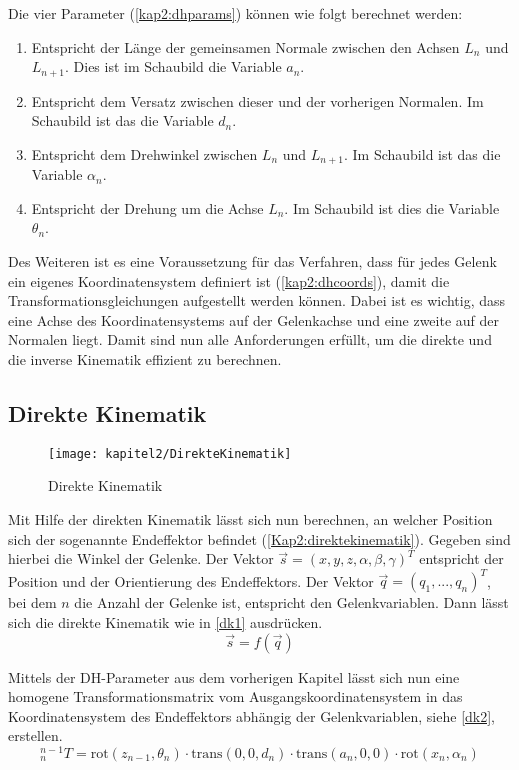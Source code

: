 Die vier Parameter (\autoref{kap2:dhparams}) können wie folgt berechnet werden:
\begin{enumerate}
  \item Entspricht der Länge der gemeinsamen Normale zwischen den Achsen $L_n$ und $L_{n+1}$. Dies ist im Schaubild die Variable $a_n$.
  \item Entspricht dem Versatz zwischen dieser und der vorherigen Normalen. Im Schaubild ist das die Variable $d_n$.
  \item Entspricht dem Drehwinkel zwischen $L_n$ und $L_{n+1}$. Im Schaubild ist das die Variable $\alpha_n$.
  \item Entspricht der Drehung um die Achse $L_n$. Im Schaubild ist dies die Variable $\theta_n$.
\end{enumerate} 

Des Weiteren ist es eine Voraussetzung für das Verfahren, dass für jedes Gelenk ein eigenes Koordinatensystem definiert ist (\autoref{kap2:dhcoords}), damit die Transformationsgleichungen aufgestellt werden können. Dabei ist es wichtig, dass eine Achse des Koordinatensystems auf der Gelenkachse und eine zweite auf der Normalen liegt. Damit sind nun alle Anforderungen erfüllt, um die direkte und die inverse Kinematik effizient zu berechnen.

\subsection{Direkte Kinematik}

\begin{figure}[b!]
  \centering
  \texttt{[image: kapitel2/DirekteKinematik]}
  \caption{Direkte Kinematik}
  \label{Kap2:direktekinematik}
\end{figure}

Mit Hilfe der direkten Kinematik lässt sich nun berechnen, an welcher Position sich der sogenannte Endeffektor befindet (\autoref{Kap2:direktekinematik}). Gegeben sind hierbei die Winkel der Gelenke. Der Vektor $ \vec{s} = (x,y,z,\alpha,\beta,\gamma)^T $  entspricht der Position und der Orientierung des Endeffektors. Der Vektor $ \vec{q} = (q_1, ...,q_n)^T $, bei dem $n$ die Anzahl der Gelenke ist, entspricht den Gelenkvariablen. Dann lässt sich die direkte Kinematik wie in \autoref{dk1} ausdrücken.
\begin{equation}
  \vec{s} = f(\vec{q})
\label{dk1}
\end{equation}

Mittels der DH-Parameter aus dem vorherigen Kapitel lässt sich nun eine homogene Transformationsmatrix vom Ausgangskoordinatensystem in das Koordinatensystem des Endeffektors abhängig der Gelenkvariablen, siehe \autoref{dk2}, erstellen.
\begin{equation}
  ^{n-1}_{n}T = \textrm{rot}(z_{n-1},\theta_n) \cdot \textrm{trans}(0,0,d_{n}) \cdot \textrm{trans}(a_{n},0,0) \cdot \textrm{rot}(x_{n},\alpha_{n})
\label{dk2}
\end{equation}

